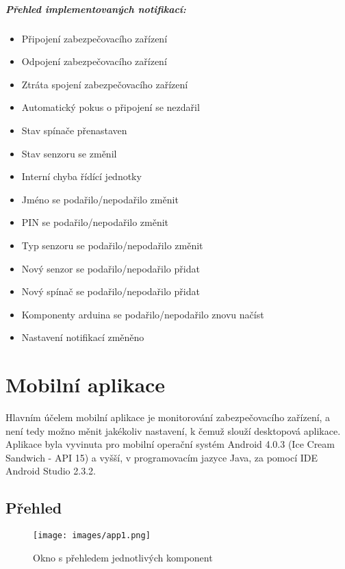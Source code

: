 \documentclass[FM,MP]{tulthesis}  %
\begin{document}
\paragraph{Přehled implementovaných notifikací:}
\begin{itemize}
\item Připojení zabezpečovacího zařízení
\item Odpojení zabezpečovacího zařízení
\item Ztráta spojení zabezpečovacího zařízení
\item Automatický pokus o připojení se nezdařil
\item Stav spínače přenastaven
\item Stav senzoru se změnil
\item Interní chyba řídící jednotky
\item Jméno se podařilo/nepodařilo změnit
\item PIN se podařilo/nepodařilo změnit
\item Typ senzoru se podařilo/nepodařilo změnit
\item Nový senzor se podařilo/nepodařilo přidat
\item Nový spínač se podařilo/nepodařilo přidat
\item Komponenty arduina se podařilo/nepodařilo znovu načíst
\item Nastavení notifikací změněno
\end{itemize} 


\chapter{Mobilní aplikace}
Hlavním účelem mobilní aplikace je monitorování zabezpečovacího zařízení, a není tedy možno měnit jakékoliv nastavení, k čemuž slouží desktopová aplikace. Aplikace byla vyvinuta pro mobilní operační systém Android 4.0.3 (Ice Cream Sandwich - API 15) a vyšší, v programovacím jazyce Java, za pomocí IDE Android Studio 2.3.2.

\section{Přehled}
\begin{figure}[H]
\begin{center}
\texttt{[image: images/app1.png]}
\caption{Okno s přehledem jednotlivých komponent}
\label{image}
\end{center}
\end{figure}
\end{document}
